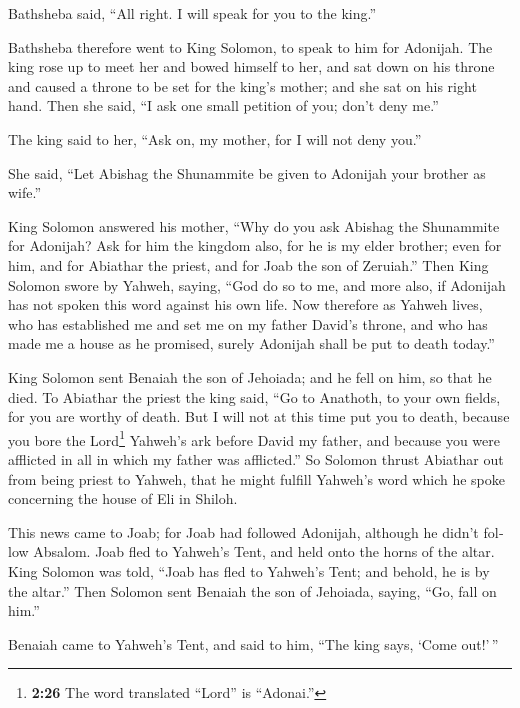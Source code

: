\begin{paracol}{2}
\begin{otherlanguage}{english}
 Bathsheba said, ``All right. I will speak for you to the
king.''

 Bathsheba therefore went to King Solomon, to speak to
him for Adonijah. The king rose up to meet her and bowed himself to her,
and sat down on his throne and caused a throne to be set for the king's
mother; and she sat on his right hand.  Then she said,
``I ask one small petition of you; don't deny me.''

The king said to her, ``Ask on, my mother, for I will not deny you.''

 She said, ``Let Abishag the Shunammite be given to
Adonijah your brother as wife.''

 King Solomon answered his mother, ``Why do you ask
Abishag the Shunammite for Adonijah? Ask for him the kingdom also, for
he is my elder brother; even for him, and for Abiathar the priest, and
for Joab the son of Zeruiah.''  Then King Solomon swore
by Yahweh, saying, ``God do so to me, and more also, if Adonijah has not
spoken this word against his own life.  Now therefore as
Yahweh lives, who has established me and set me on my father David's
throne, and who has made me a house as he promised, surely Adonijah
shall be put to death today.''

 King Solomon sent Benaiah the son of Jehoiada; and he
fell on him, so that he died.  To Abiathar the priest the
king said, ``Go to Anathoth, to your own fields, for you are worthy of
death. But I will not at this time put you to death, because you bore
the Lord\footnote{\textbf{2:26} The word translated ``Lord'' is
  ``Adonai.''} Yahweh's ark before David my father, and because you were
afflicted in all in which my father was afflicted.''  So
Solomon thrust Abiathar out from being priest to Yahweh, that he might
fulfill Yahweh's word which he spoke concerning the house of Eli in
Shiloh.

 This news came to Joab; for Joab had followed Adonijah,
although he didn't follow Absalom. Joab fled to Yahweh's Tent, and held
onto the horns of the altar.  King Solomon was told,
``Joab has fled to Yahweh's Tent; and behold, he is by the altar.'' Then
Solomon sent Benaiah the son of Jehoiada, saying, ``Go, fall on him.''

 Benaiah came to Yahweh's Tent, and said to him, ``The
king says, `Come out!'\,''


\end{otherlanguage}
\end{paracol}
